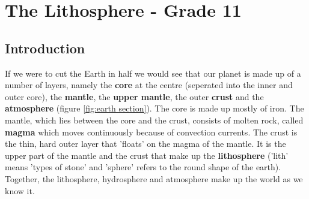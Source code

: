 






\chapter{The Lithosphere - Grade 11}
\label{chap:lith}



\section{Introduction}
\label{sec:lith:intro}

If we were to cut the Earth in half we would see that our planet is made up of a number of layers, namely the \textbf{core} at the centre (seperated into the inner and outer core), the \textbf{mantle}, the \textbf{upper mantle}, the outer \textbf{crust} and the \textbf{atmosphere} (figure \ref{fig:earth section}). The core is made up mostly of iron. The mantle, which lies between the core and the crust, consists of molten rock, called \textbf{magma} which moves continuously because of convection currents. The crust is the thin, hard outer layer that 'floats' on the magma of the mantle. It is the upper part of the mantle and the crust that make up the \textbf{lithosphere} ('lith' means 'types of stone' and 'sphere' refers to the round shape of the earth). Together, the lithosphere, hydrosphere and atmosphere make up the world as we know it. \\

